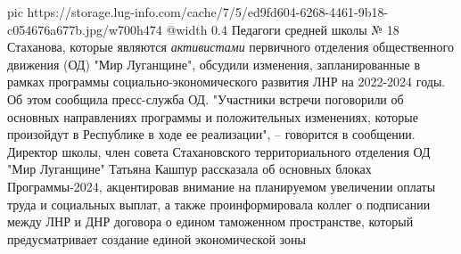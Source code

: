\ifcmt
  pic https://storage.lug-info.com/cache/7/5/ed9fd604-6268-4461-9b18-c054676a677b.jpg/w700h474
  @width 0.4
\fi
Педагоги средней школы № 18 Стаханова, которые являются \emph{активистами} первичного
отделения общественного движения (ОД) "Мир Луганщине", обсудили изменения,
запланированные в рамках программы социально-экономического развития ЛНР на
2022-2024 годы. Об этом сообщила пресс-служба ОД.  "Участники встречи
поговорили об основных направлениях программы и положительных изменениях,
которые произойдут в Республике в ходе ее реализации", – говорится в сообщении.
Директор школы, член совета Стахановского территориального отделения ОД "Мир
Луганщине" Татьяна Кашпур рассказала об основных блоках Программы-2024,
акцентировав внимание на планируемом увеличении оплаты труда и социальных
выплат, а также проинформировала коллег о подписании между ЛНР и ДНР договора о
едином таможенном пространстве, который предусматривает создание единой
экономической зоны
  
